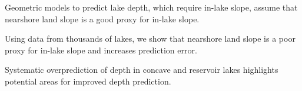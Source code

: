\documentclass[draft]{agujournal2019}
\begin{document}




\begin{keypoints}
\item Geometric models to predict lake depth, which require in-lake slope, assume that nearshore land slope is a good proxy for in-lake slope.
\item Using data from thousands of lakes, we show that nearshore land slope is a poor proxy for in-lake slope and increases prediction error.
\item Systematic overprediction of depth in concave and reservoir lakes highlights potential areas for improved depth prediction.
\end{keypoints}

%
%
\end{document}
